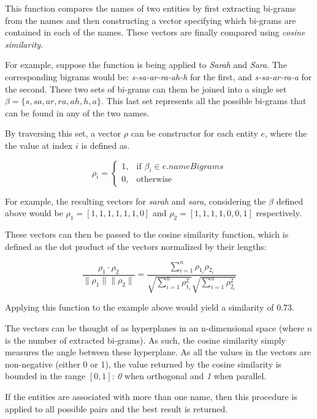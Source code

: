 \documentclass[epsfig,a4paper,11pt,titlepage,twoside,openany]{book}
\begin{document}
This function compares the names of two entities by first extracting bi-grams from the names and then constructing a vector specifying which bi-grams are contained in each of the names. These vectors are finally compared using \textit{cosine similarity}. 

For example, suppose the function is being applied to \textit{Sarah} and \textit{Sara}. The corresponding bigrams would be: \textit{s-sa-ar-ra-ah-h} for the first, and \textit{s-sa-ar-ra-a} for the second. These two sets of bi-grams can them be joined into a single set $\beta = \{s, sa, ar, ra, ah, h, a\}$. This last set represents all the possible bi-grams that can be found in any of the two names. 

By traversing this set, a vector $\rho$ can be constructor for each entity $e$, where the the value at index $i$ is defined as. 

\begin{equation*}
\rho_i = \begin{cases}
            1, & \text{if } \beta_i \in e.nameBigrams \\
            0, & \text{otherwise}
        \end{cases} 
\end{equation*}

For example, the resulting vectors for \textit{sarah} and \textit{sara}, considering the $\beta$ defined above would be $\rho_1 = [1, 1, 1, 1, 1, 1, 0]$ and $\rho_2 = [1, 1, 1, 1, 0, 0, 1]$ respectively.

These vectors can then be passed to the cosine similarity function, which is defined as the dot product of the vectors normalized by their lengths:

$$
\frac{\rho_1 \cdot \rho_2}{\|\rho_1\| \|\rho_2\|} = \frac{
\sum_{i=1}^n \rho_{1_i} \rho_{2_i}}{
\sqrt{\sum_{i=1}^n \rho_{1_i}^2}
\sqrt{\sum_{i=1}^n \rho_{2_i}^2}
}
$$

Applying this function to the example above would yield a similarity of 0.73. 

The vectors can be thought of as hyperplanes in an n-dimensional space (where $n$ is the number of extracted bi-grams). As such, the cosine similarity simply measures the angle between these hyperplane. As all the values in the vectors are non-negative (either 0 or 1), the value returned by the cosine similarity is bounded in the range $[0,1]$: \textit{0} when orthogonal and \textit{1} when parallel.

If the entities are associated with more than one name, then this procedure is applied to all possible pairs and the best result is returned.
\end{document}
